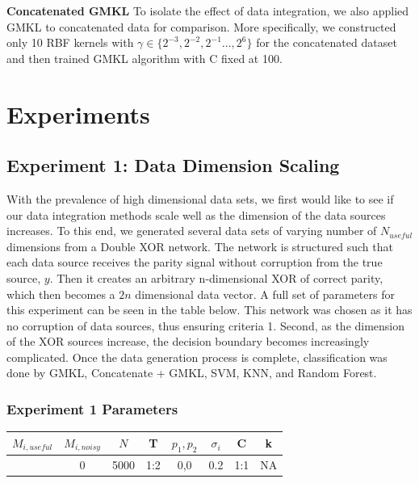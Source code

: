 \documentclass{article}
\begin{document}
\textbf{Concatenated GMKL}
To isolate the effect of data integration, we also applied GMKL to concatenated
data for comparison. More specifically, we constructed only 10 RBF kernels with
$\gamma \in \{2^{-3}, 2^{-2}, 2^{-1} ..., 2^{6}\}$ for the concatenated dataset
and then trained GMKL algorithm with C fixed at 100.\\













\section*{Experiments}



\subsection*{Experiment 1: Data Dimension Scaling}
With the prevalence of high dimensional data sets, we first would like to see
if our data integration methods scale well as the dimension of the data sources
increases. To this end, we generated several data sets of varying number of
$N_{useful}$ dimensions from a Double XOR network. The network is
structured such that each data source receives the parity signal without
corruption from the true source, $y$. Then it creates an arbitrary n-dimensional
XOR of correct parity, which then becomes a $2n$ dimensional data vector.  A full
set of parameters for this experiment can be seen in the table below. This network was
chosen as it has no corruption of data sources, thus ensuring criteria 1.
Second, as the dimension of the XOR sources increase, the decision boundary becomes
increasingly complicated. Once the data generation process is complete,
classification was done by GMKL, Concatenate + GMKL, SVM, KNN, and Random
Forest.

\subsubsection*{Experiment 1 Parameters}
\begin{center}
\begin{tabular}{|c|c|c|c|c|c|c|c|}
\hline
$M_{i,useful}$ & $M_{i, noisy}$ & $N$ & T &  $p_1, p_2$ & $\sigma_i$ & C &  k  \\
\hline
[2,3,4,5,6,7] & 0 & 5000 & 1:2 & 0,0 & 0.2 & 1:1 & NA  \\
\hline
\end{tabular}
\end{center}
\end{document}
